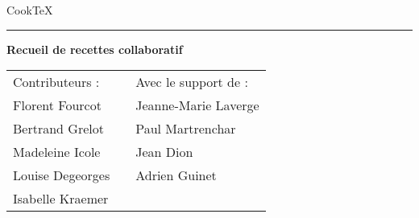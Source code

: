 \thispagestyle{empty}

\newenvironment{vcenterpage}
{\newpage\vspace*{\fill}}
{\vspace*{\fill}\par\pagebreak}
\def\thickhrulefill{\leavevmode \leaders \hrule height 1pt\hfill \kern \z@}



\begin{titlepage}
\begin{tabular}{p{10cm}p{5cm}}
\end{tabular}    
\vspace*{1.5cm}

\begin{flushleft}
\huge Cook\TeX
\end{flushleft}
\par
\hrule height 4pt
\par
\begin{flushright}
\textcolor[gray]{0.5}{\LARGE \textbf{Recueil de recettes collaboratif}}
\end{flushright}

\vspace*{9cm}

\begin{center}
\begin{tabular}{lp{3cm}l}
\textcolor[gray]{0.4}{\large Contributeurs :} & & \textcolor[gray]{0.4}{\large Avec le support de :}\\
Florent Fourcot & & Jeanne-Marie Laverge\\
Bertrand Grelot & & Paul Martrenchar\\
Madeleine Icole & & Jean Dion\\
Louise Degeorges & & Adrien Guinet\\
Isabelle Kraemer & & \\
\end{tabular}
\end{center}

\end{titlepage}


